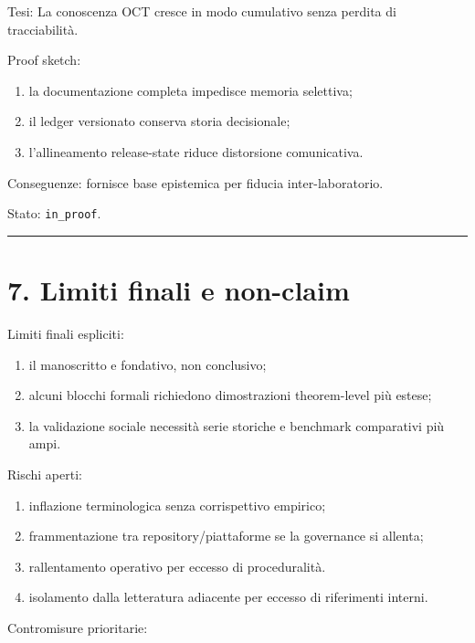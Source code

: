 Tesi:
La conoscenza OCT cresce in modo cumulativo senza perdita di tracciabilità.

Proof sketch:

\begin{enumerate}
\def\labelenumi{\arabic{enumi}.}
\tightlist
\item
  la documentazione completa impedisce memoria selettiva;
\item
  il ledger versionato conserva storia decisionale;
\item
  l'allineamento release-state riduce distorsione comunicativa.
\end{enumerate}

Conseguenze:
fornisce base epistemica per fiducia inter-laboratorio.

Stato: \texttt{in\_proof}.

\begin{center}\rule{0.5\linewidth}{0.5pt}\end{center}

\section{7. Limiti finali e non-claim}

Limiti finali espliciti:

\begin{enumerate}
\def\labelenumi{\arabic{enumi}.}
\tightlist
\item
  il manoscritto e fondativo, non conclusivo;
\item
  alcuni blocchi formali richiedono dimostrazioni theorem-level più estese;
\item
  la validazione sociale necessità serie storiche e benchmark comparativi più ampi.
\end{enumerate}

Rischi aperti:

\begin{enumerate}
\def\labelenumi{\arabic{enumi}.}
\tightlist
\item
  inflazione terminologica senza corrispettivo empirico;
\item
  frammentazione tra repository/piattaforme se la governance si allenta;
\item
  rallentamento operativo per eccesso di proceduralità.
\item
  isolamento dalla letteratura adiacente per eccesso di riferimenti interni.
\end{enumerate}

Contromisure prioritarie:

